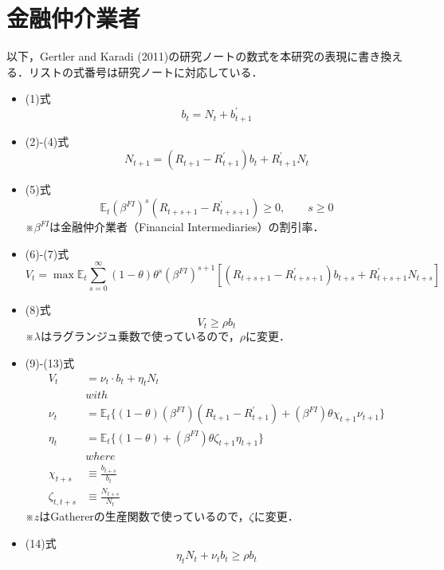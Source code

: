 \documentclass[dvipdfmx]{jlreq}
\begin{document}
\section{金融仲介業者}
以下，Gertler and Karadi (2011)の研究ノートの数式を本研究の表現に書き換える．リストの式番号は研究ノートに対応している．
\begin{itemize}
  \item (1)式
    \begin{equation}
      b_t = N_t + b^\prime_{t+1}
    \end{equation}

  \item (2)-(4)式
    \begin{equation}
      N_{t+1} = (R_{t+1} - R^\prime_{t+1}) b_t + R^\prime_{t+1} N_t
    \end{equation}

  \item (5)式
    \begin{equation}
      \mathbb{E}_t (\beta^{FI})^s (R_{t+s+1} - R^\prime_{t+s+1}) \geq 0,
      \qquad s \geq 0
    \end{equation}
    ※$\beta^{FI}$は金融仲介業者（Financial Intermediaries）の割引率．

  \item (6)-(7)式
    \begin{equation}
      V_t = \max \mathbb{E}_t \sum_{s=0}^\infty (1-\theta) \theta^s (\beta^{FI})^{s+1} [(R_{t+s+1} - R^\prime_{t+s+1}) b_{t+s} + R^\prime_{t+s+1} N_{t+s}]
    \end{equation}

  \item (8)式
    \begin{equation}
      V_t \geq \rho b_t
    \end{equation}
    ※$\lambda$はラグランジュ乗数で使っているので，$\rho$に変更．

  \item (9)-(13)式
    \begin{align}
      V_t &= \nu_t \cdot b_t + \eta_t N_t \\
      &with \\
      \nu_t &= \mathbb{E}_t \{ (1-\theta) (\beta^{FI}) (R_{t+1} - R^\prime_{t+1}) + (\beta^{FI}) \theta \chi_{t+1} \nu_{t+1} \} \\
      \eta_t &= \mathbb{E}_t \{ (1-\theta) + (\beta^{FI}) \theta \zeta_{t+1} \eta_{t+1} \} \\
      &where \\
      \chi_{t+s} &\equiv \frac{b_{t+s}}{b_t} \\
      \zeta_{t,t+s} &\equiv \frac{N_{t+s}}{N_t}
    \end{align}
    ※$z$はGathererの生産関数で使っているので，$\zeta$に変更．
  \item (14)式
    \begin{equation}
      \eta_t N_{t} + \nu_t b_t \geq \rho b_t
    \end{equation}


\end{itemize}
\end{document}
